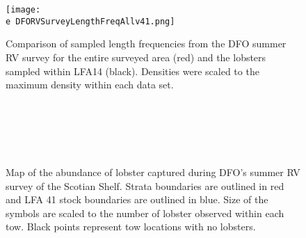 \documentclass[11pt]{article}
\newcommand{\D}{.}
\newcommand{\e}{/backup/bio_data/bio.lobster/figures/} %
\begin{document}
\begin{figure}
\centering
    \texttt{[image: \\e DFORVSurveyLengthFreqAllv41.png]}
    \caption{Comparison of sampled length frequencies from the DFO summer RV survey for the entire surveyed area (red) and the lobsters sampled within LFA14 (black). Densities were scaled to the maximum density within each data set.}
\end{figure}

        \begin{figure}
        \centering
        \\
        \\
        \\
        \\


         \caption{Map of the abundance of lobster captured during DFO's summer RV survey of the Scotian Shelf. Strata boundaries are outlined in red and LFA 41 stock boundaries are outlined in blue. Size of the symbols are scaled to the number of lobster observed within each tow. Black points represent tow locations with no lobsters.}
        \end{figure}
        \clearpage
\end{document}

